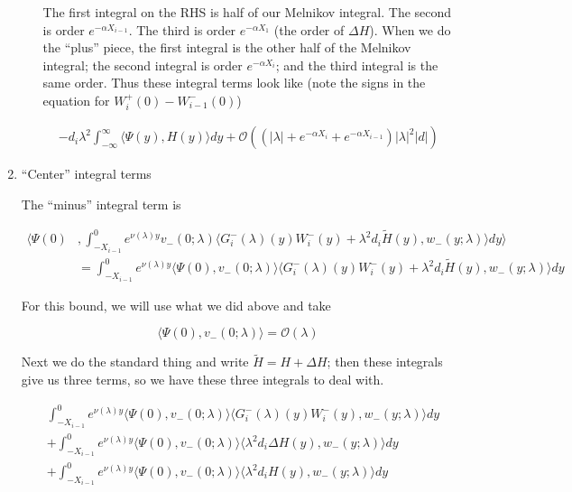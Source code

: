 \documentclass[12pt]{article}
\begin{document}
\begin{enumerate}
\begin{enumerate}[(i)]
The first integral on the RHS is half of our Melnikov integral. The second is order $e^{-\alpha X_{i-1}}$. The third is order $e^{-\alpha X_1}$ (the order of $\Delta H$). When we do the ``plus'' piece, the first integral is the other half of the Melnikov integral; the second integral is order $e^{-\alpha X_i}$; and the third integral is the same order. Thus these integral terms look like (note the signs in the equation for $W_i^+(0) - W_{i-1}^-(0)$)

\begin{align*}
-d_i \lambda^2 \int_{-\infty}^\infty \langle \Psi(y), H(y) \rangle dy + \mathcal{O}( ( |\lambda| + e^{-\alpha X_i} + e^{-\alpha X_{i-1}} ) |\lambda|^2 |d|)
\end{align*}

\end{enumerate}

\item ``Center'' integral terms

The ``minus'' integral term is

\begin{align*}
\langle \Psi(0) &, \int_{-X_{i-1}}^0
e^{\nu(\lambda)y} v_-(0; \lambda) \langle G_i^-(\lambda)(y)W_i^-(y) + \lambda^2 d_i \tilde{H}(y), w_-(y; \lambda) \rangle dy \rangle \\
&= \int_{-X_{i-1}}^0
e^{\nu(\lambda)y} \langle \Psi(0), v_-(0; \lambda) \rangle \langle G_i^-(\lambda)(y)W_i^-(y) + \lambda^2 d_i \tilde{H}(y), w_-(y; \lambda) \rangle dy 
\end{align*}

For this bound, we will use what we did above and take

\[
\langle \Psi(0), v_-(0; \lambda) \rangle = \mathcal{O}(\lambda)
\]

Next we do the standard thing and write $\tilde{H} = H + \Delta H$; then these integrals give us three terms, so we have these three integrals to deal with.

\begin{align*}
&\int_{-X_{i-1}}^0
e^{\nu(\lambda)y} \langle \Psi(0), v_-(0; \lambda) \rangle \langle G_i^-(\lambda)(y)W_i^-(y) , w_-(y; \lambda) \rangle dy \\
&+\int_{-X_{i-1}}^0
e^{\nu(\lambda)y} \langle \Psi(0), v_-(0; \lambda) \rangle \langle \lambda^2 d_i \Delta H(y), w_-(y; \lambda) \rangle dy \\
&+\int_{-X_{i-1}}^0
e^{\nu(\lambda)y} \langle \Psi(0), v_-(0; \lambda) \rangle \langle \lambda^2 d_i H(y), w_-(y; \lambda) \rangle dy 
\end{align*}


\end{enumerate}
\end{document}
